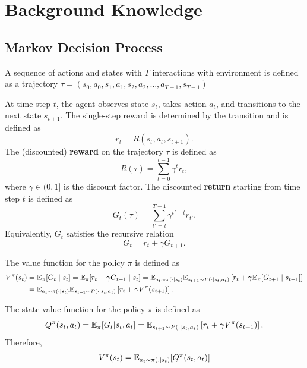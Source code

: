 \section{Background Knowledge}

\subsection{Markov Decision Process}
\begin{definition}
A sequence of actions and states with $T$ interactions with environment is defined as a trajectory $\tau = (s_0, a_0, s_1,a_1,s_2,a_2,\ldots, a_{T-1}, s_{T-1})$ 
\end{definition}

\begin{definition}[Reward and Return] 
At time step $t$, the agent observes state $s_t$, takes action $a_t$, and transitions to the next state $s_{t+1}$. The single-step reward is determined by the transition and is defined as
$$
r_t = R(s_t,a_t,s_{t+1}).
$$ 
The (discounted) \textbf{reward} on the trajectory $\tau$ is defined as 
$$
    R(\tau) = \sum_{t=0}^{t-1}\gamma^{t}r_t,
$$
where $\gamma\in(0,1]$ is the discount factor. The discounted \textbf{return} starting from time step $t$ is defined as
$$
    G_t(\tau) = \sum_{t'=t}^{T-1}\gamma^{t'-t}r_{t'}. 
$$
Equivalently, $G_t$ satisfies the recursive relation
$$
G_t = r_t + \gamma G_{t+1}.
$$
\end{definition}


\begin{definition}
The value function for the policy $\pi$ is defined as
$$
\begin{aligned}
V^\pi(s_t)
&= \mathbb{E}_{\pi} [G_t \mid s_t]  = \mathbb{E}_{\pi} [r_t + \gamma G_{t+1} \mid s_t] = \mathbb{E}_{a_t\sim \pi(\cdot\mid s_t)}
\mathbb{E}_{s_{t+1}\sim P(\cdot\mid s_t,a_t)}
\left[
r_t + \gamma \mathbb{E}_{\pi}[G_{t+1}\mid s_{t+1}]
\right] \\
&= \mathbb{E}_{a_t\sim \pi(\cdot\mid s_t)}
\mathbb{E}_{s_{t+1}\sim P(\cdot\mid s_t,a_t)}
\left[
r_t + \gamma V^\pi(s_{t+1})
\right].
\end{aligned}
$$

The state-value function for the policy $\pi$ is defined as
$$
Q^{\pi}(s_t, a_t) = \mathbb{E}_{\pi} [G_t | s_t, a_t] = \mathbb{E}_{s_{t+1}\sim P(.|s_t, a_t)}\left[r_t + \gamma V^{\pi}(s_{t+1})\right].
$$
Therefore,
$$
V^{\pi}(s_t) = \mathbb{E}_{a_t\sim \pi(.|s_t)} [Q^{\pi}(s_t, a_t)]
$$
\end{definition}



